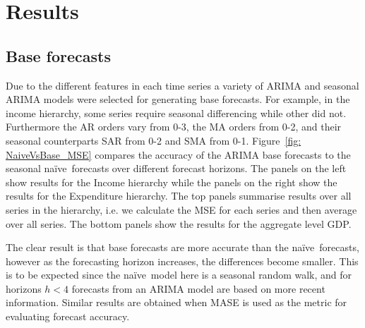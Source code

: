 \documentclass[graybox]{svmult}
\def\naive{na\"{i}ve\ }
\begin{document}
%
%
%
%




\section{Results}\label{sec:results}

\subsection{Base forecasts}

Due to the different features in each time series a variety of ARIMA and seasonal ARIMA models were selected for generating base forecasts. For example, in the income hierarchy, some series require seasonal differencing while other did not. Furthermore the AR orders vary from 0-3, the MA orders from 0-2, and their seasonal counterparts SAR from 0-2 and SMA from 0-1. Figure~\ref{fig: NaiveVsBase_MSE} compares the accuracy of the ARIMA base forecasts to the seasonal \naive forecasts over different forecast horizons.  The panels on the left show results for the Income hierarchy while the panels on the right show the results for the Expenditure hierarchy. The top panels summarise results over all series in the hierarchy, i.e. we calculate the MSE for each series and then average over all series. The bottom panels show the results for the aggregate level GDP.

The clear result is that base forecasts are more accurate than the \naive forecasts, however as the forecasting horizon increases, the differences become smaller. This is to be expected since the \naive model here is a seasonal random walk, and for horizons $h<4$ forecasts from an ARIMA model are based on more recent information. Similar results are obtained when MASE is used as the metric for evaluating forecast accuracy.
\end{document}
